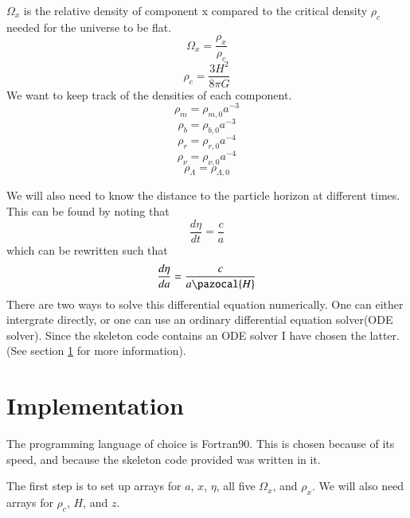 \documentclass{aa}   %
\begin{document}
$\Omega_x$ is the relative density of component x compared to the critical density $\rho_c$ needed for the universe to be flat.
\begin{equation}
 \Omega_x = \frac{\rho_x}{\rho_c}
\end{equation}
\begin{equation}
 \rho_c = \frac{3H^2}{8\pi G}
\end{equation}
We want to keep track of the densities of each component.
\begin{equation}
 \rho_m = \rho_{m,0}a^{-3}
\end{equation}
\begin{equation}
 \rho_b = \rho_{b,0}a^{-3}
\end{equation}
\begin{equation}
 \rho_r = \rho_{r,0}a^{-4}
\end{equation}
\begin{equation}
 \rho_\nu = \rho_{\nu,0}a^{-4}
\end{equation}
\begin{equation}
 \rho_\Lambda = \rho_{\Lambda,0}
\end{equation}

We will also need to know the distance to the particle horizon at different times. This can be found by noting that
\begin{equation*}
 \frac{d\eta}{dt} = \frac{c}{a}
\end{equation*}
which can be rewritten such that
\begin{equation}\label{eta}
 \frac{d\eta}{da} = \frac{c}{a \pazocal{H}}
\end{equation}
There are two ways to solve this differential equation numerically. One can either intergrate directly, or one can use an ordinary differential equation solver(ODE solver). Since the skeleton code contains an ODE solver I have chosen the latter. (See section \ref{sec:Imp} for more information).

\section{Implementation}\label{sec:Imp}
The programming language of choice is Fortran90. This is chosen because of its speed, and because the skeleton code provided was written in it. 

The first step is to set up arrays for $a$, $x$, $\eta$, all five $\Omega_x$, and $\rho_x$. We will also need arrays for $\rho_c$, $H$, and $z$.
\end{document}
